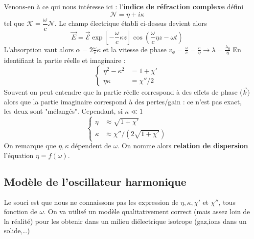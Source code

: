 \begin{enumerate}
	Venons-en à ce qui nous intéresse ici : l'\textbf{indice de réfraction complexe} défini
	\begin{equation}
	\mathcal{N} = \eta +i\kappa
	\end{equation}
	tel que $\mathcal{K}=\dfrac{\omega}{c}\mathcal{N}$. Le champ électrique établi ci-dessus devient alors
	\begin{equation}
	\vec{E} =\vec{\mathcal{E}}\exp\left[-\frac{\omega}{c}\kappa z\right]\cos\left(\frac{\omega}{c}\eta z-\omega t\right)
	\end{equation}
	L’absorption vaut alors $\alpha = 2\frac{\omega}{c}\kappa$ et la vitesse de phase $v_\phi = \frac{\omega}
	{c}=\frac{c}{\eta} \to \lambda=\frac{\lambda_0}{\eta}$
	En identifiant la partie réelle et imaginaire :
	\begin{equation}
	\left\{\begin{array}{ll}
	\eta^2-\kappa^2 &= 1+\chi'\\
	\eta\kappa &= \chi''/2
	\end{array}\right.
	\end{equation}
	Souvent on peut entendre que la partie réelle correspond à des effets de phase ($\vec{k}$) alors que la partie 
	imaginaire correspond à des pertes/gain : ce n'est pas exact, les deux sont "mélangés". Cependant, si 
	$\kappa\ll 1$
	\begin{equation}
	\left\{\begin{array}{ll}
	\eta &\approx \sqrt{1+\chi'}\\
	\kappa &\approx \chi''/(2\sqrt{1+\chi'})
	\end{array}\right.
	\end{equation}
	On remarque que $\eta,\kappa$ dépendent de $\omega$. On nomme alors \textbf{relation de dispersion} l'équation $\eta = f(\omega)$.
	\end{enumerate}
	
	\subsection{Modèle de l'oscillateur harmonique}
	Le souci est que nous ne connaissons pas les expression de $\eta, \kappa, \chi'$ et $\chi''$, tous fonction 
	de $\omega$. On va utilisé un modèle qualitativement correct (mais assez loin de la réalité) pour les obtenir 
	dans un milieu diélectrique isotrope (gaz,ions dans un solide,\dots)\\
	
